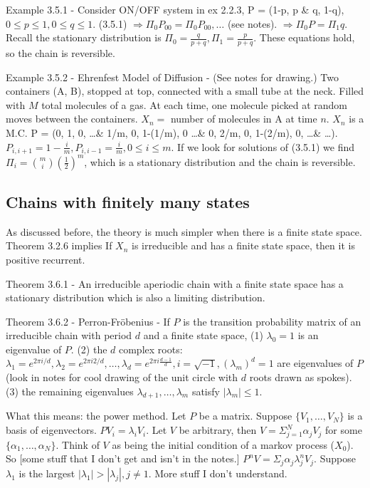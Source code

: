 \documentclass{article}
\begin{document}
Example 3.5.1 - Consider ON/OFF system in ex 2.2.3, P = (1-p, p \& q, 1-q), $0 \le p \le 1, 0 \le q \le 1$. (3.5.1) $\Rightarrow \Pi_0 P_{00} = \Pi_0 P_{00}, \dots$ (see notes). $\Rightarrow \Pi_0 P = \Pi_1 q$. Recall the stationary distribution is $\Pi_0 = \frac{q}{p+q}, \Pi_1 = \frac{p}{p+q}$. These equations hold, so the chain is reversible.

Example 3.5.2 - Ehrenfest Model of Diffusion - (See notes for drawing.) Two containers (A, B), stopped at top, connected with a small tube at the neck. Filled with $M$ total molecules of a gas. At each time, one molecule picked at random moves between the containers. $X_n =$ number of molecules in A at time $n$. $X_n$ is a M.C. P = (0, 1, 0, \dots \& 1/m, 0, 1-(1/m), 0 \dots \& 0, 2/m, 0, 1-(2/m), 0, \dots \& \dots). $P_{i, i+1} = 1 - \frac{i}{m}, P_{i, i-1} = \frac{i}{m}, 0 \le i \le m$. If we look for solutions of (3.5.1) we find $\Pi_i = \binom{m}{i}(\frac{1}{2})^m$, which is a stationary distribution and the chain is reversible.

\subsection{Chains with finitely many states}

As discussed before, the theory is much simpler when there is a finite state space. Theorem 3.2.6 implies If $X_n$ is irreducible and has a finite state space, then it is positive recurrent.

Theorem 3.6.1 - An irreducible aperiodic chain with a finite state space has a stationary distribution which is also a limiting distribution.

Theorem 3.6.2 - Perron-Fr\"obenius - If $P$ is the transition probability matrix of an irreducible chain with period $d$ and a finite state space, (1) $\lambda_0 = 1$ is an eigenvalue of $P$. (2) the $d$ complex roots: $\lambda_1 = e^{2\pi i/d}, \lambda_2 = e^{2\pi i 2/d}, \dots, \lambda_d = e^{2\pi i \frac{d-1}{d}}, i = \sqrt{-1}, (\lambda_m)^d = 1$ are eigenvalues of $P$ (look in notes for cool drawing of the unit circle with $d$ roots drawn as spokes). (3) the remaining eigenvalues $\lambda_{d+1}, \dots, \lambda_{m}$ satisfy $|\lambda_m| \le 1$.

What this means: the power method. Let $P$ be a matrix. Suppose $\{V_1, \dots, V_N\}$ is a basis of eigenvectors. $P V_i = \lambda_i V_i$. Let $V$ be arbitrary, then $V = \Sigma_{j=1}^N \alpha_j V_j$ for some $\{\alpha_1, \dots, \alpha_N\}$. Think of $V$ as being the initial condition of a markov process ($X_0$). So [some stuff that I don't get and isn't in the notes.] $P^nV = \Sigma_j \alpha_j \lambda_j^n V_j$. Suppose $\lambda_1$ is the largest $|\lambda_1| > |\lambda_j|, j \ne 1$. More stuff I don't understand.
\end{document}
